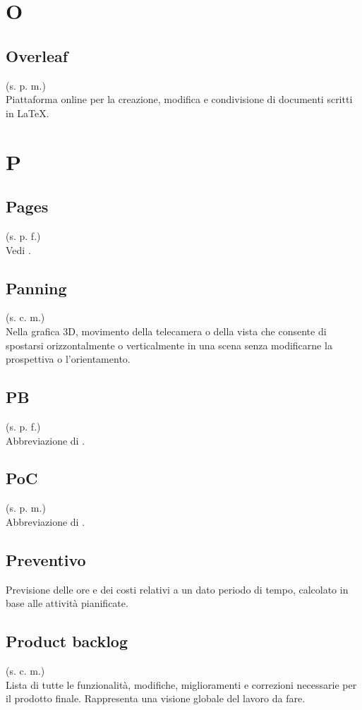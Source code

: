 \section{O}
\subsection{Overleaf}
(s. p. m.)\\
Piattaforma online per la creazione, modifica e condivisione di documenti
scritti in LaTeX.
\pagebreak
\section{P}
\subsection{Pages}
(s. p. f.)\\
Vedi .
\subsection{Panning}
(s. c. m.)\\
Nella grafica 3D, movimento della telecamera o della vista che consente
di spostarsi orizzontalmente o verticalmente in una scena senza modificarne
la prospettiva o l'orientamento.
\subsection{PB}
\label{PB}
(s. p. f.)\\
Abbreviazione di .
\subsection{PoC}
(s. p. m.)\\
Abbreviazione di .
\subsection{Preventivo}
Previsione delle ore e dei costi relativi a un dato periodo di tempo, calcolato
in base alle attività pianificate.
\subsection{Product backlog}
\label{Product backlog}
(s. c. m.)\\
Lista di tutte le funzionalità, modifiche, miglioramenti e correzioni necessarie
per il prodotto finale. Rappresenta una visione globale del lavoro da fare.
